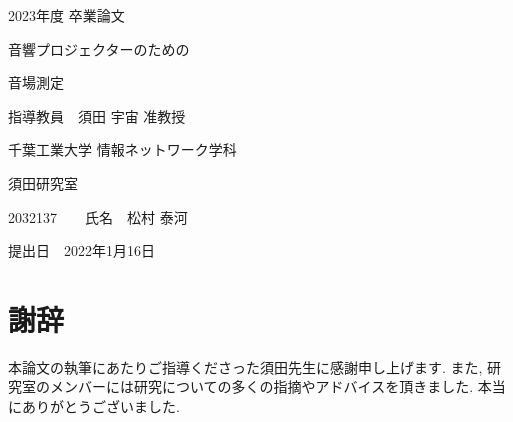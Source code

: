 \documentclass[12pt,a4j,titlepage]{ltjsarticle}
\begin{document}
\begin{titlepage}
    \begin{center}
    
        \vspace*{20truept}

        {\LARGE 2023年度  卒業論文}

        \vspace*{75truept}

        {\Huge 音響プロジェクターのための}
        \vspace{10truept}
        
        {\Huge 音場測定} 

        \vspace{85truept}

        {\LARGE 指導教員　須田 宇宙 准教授}

        \vspace{60truept}

        {\LARGE 千葉工業大学 情報ネットワーク学科}

        \vspace{15truept}

        {\LARGE 須田研究室}

        \vspace{70truept}

        {\LARGE 2032137　　氏名　松村 泰河}
        
        \vspace{70truept}
        
    \end{center}
    \begin{flushright}
    
        {\LARGE 提出日　2022年1月16日}
        
    \end{flushright}
\end{titlepage}

\setcounter{tocdepth}{3}
\tableofcontents
\clearpage

\section*{謝辞}
本論文の執筆にあたりご指導くださった須田先生に感謝申し上げます. 
また, 研究室のメンバーには研究についての多くの指摘やアドバイスを頂きました. 
本当にありがとうございました. 
\clearpage
\end{document}
